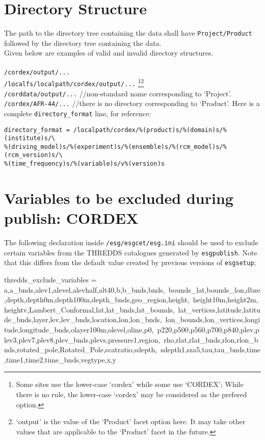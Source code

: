 \section{Directory Structure}
The path to the directory tree containing the data shall have \texttt{Project/Product} followed by the directory tree containing the data. \\
Given below are examples of valid and invalid directory structures.\\
\vspace{0mm}\\
\texttt{/cordex/output/...} \cmark\\
\texttt{/localfs/localpath/cordex/output/...} \cmark \footnote{Some sites use the lower-case `cordex' while some use `CORDEX'; While there is no rule, the lower-case `cordex' may be considered as the prefered option.}\footnote{`output' is the value of the `Product' facet option here. It may take other values that are applicable to the `Product' facet in the future.} \\
\texttt{/corddata/output/...} \xmark{ } //non-standard name corresponding to `Project'.  \\ 
\texttt{/cordex/AFR-44/...} \xmark{ } //there is no directory corresponding to `Product'. Here is a complete \texttt{directory\_format} line, for reference:
\begin{verbatim}
directory_format = /localpath/cordex/%(product)s/%(domain)s/%(institute)s/\
%(driving_model)s/%(experiment)s/%(ensemble)s/%(rcm_model)s/%(rcm_version)s/\
%(time_frequency)s/%(variable)s/v%(version)s
\end{verbatim}

\section{Variables to be excluded during publish: CORDEX}
\label{skipvars}

The following declaration inside \texttt{/esg/esgcet/esg.ini} should be used to exclude certain variables from the THREDDS catalogues generated by \texttt{esgpublish}.  Note that this differs from the default value created by previous versions of \texttt{esgsetup}; 

\begin{verbatimtab}[4]
thredds_exclude_variables = a,a_bnds,alev1,alevel,alevhalf,alt40,b,b_bnds,bnds,\
bounds_lat,bounds_lon,dbze,depth,depth0m,depth100m,depth_bnds,geo_region,height,\
height10m,height2m,heightv,Lambert_Conformal,lat,lat_bnds,lat_bounds,\
lat_vertices,latitude,latitude_bnds,layer,lev,lev_bnds,location,lon,lon_bnds,\
lon_bounds,lon_vertices,longitude,longitude_bnds,olayer100m,olevel,oline,p0,\
p220,p500,p560,p700,p840,plev,plev3,plev7,plev8,plev_bnds,plevs,pressure1,region,\
rho,rlat,rlat_bnds,rlon,rlon_bnds,rotated_pole,Rotated_Pole,scatratio,sdepth,\
sdepth1,sza5,tau,tau_bnds,time,time1,time2,time_bnds,vegtype,x,y
\end{verbatimtab}

